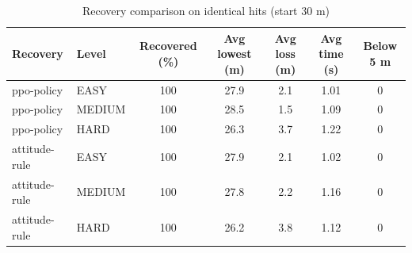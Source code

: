 \begin{table}[h]
\centering
\caption{Recovery comparison on identical hits (start 30 m)}
\begin{tabular}{llccccc}
\hline
Recovery & Level & Recovered (\%) & Avg lowest (m) & Avg loss (m) & Avg time (s) & Below 5 m \\
\hline
ppo-policy & EASY & 100 & 27.9 & 2.1 & 1.01 & 0 \\
ppo-policy & MEDIUM & 100 & 28.5 & 1.5 & 1.09 & 0 \\
ppo-policy & HARD & 100 & 26.3 & 3.7 & 1.22 & 0 \\
\hline
attitude-rule & EASY & 100 & 27.9 & 2.1 & 1.02 & 0 \\
attitude-rule & MEDIUM & 100 & 27.8 & 2.2 & 1.16 & 0 \\
attitude-rule & HARD & 100 & 26.2 & 3.8 & 1.12 & 0 \\
\hline
\end{tabular}
\end{table}
